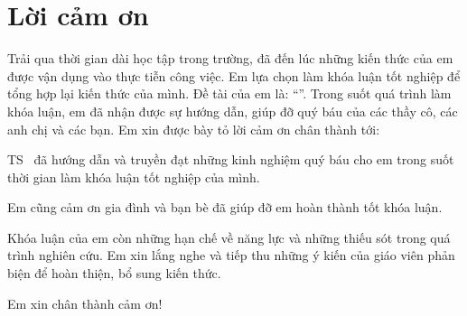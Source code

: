 \chapter*{Lời cảm ơn}
\label{thanks}

Trải qua thời gian dài học tập trong trường, đã đến lúc những kiến thức của em được vận dụng vào thực tiễn công việc. Em lựa chọn làm khóa luận tốt nghiệp để tổng hợp lại kiến thức của mình. Đề tài của em là: “\tenKL”. Trong suốt quá trình làm khóa luận, em đã nhận được sự hướng dẫn, giúp đỡ quý báu của các thầy cô, các anh chị và các bạn. Em xin được bày tỏ lời cảm ơn chân thành tới:

TS \tenGVHD\ đã hướng dẫn và truyền đạt những kinh nghiệm quý báu cho em trong suốt thời gian làm khóa luận tốt nghiệp của mình.

Em cũng cảm ơn gia đình và bạn bè đã giúp đỡ em hoàn thành tốt khóa luận.

Khóa luận của em còn những hạn chế về năng lực và những thiếu sót trong quá trình nghiên cứu. Em xin lắng nghe và tiếp thu những ý kiến của giáo viên phản biện để hoàn thiện, bổ sung kiến thức.

Em xin chân thành cảm ơn!